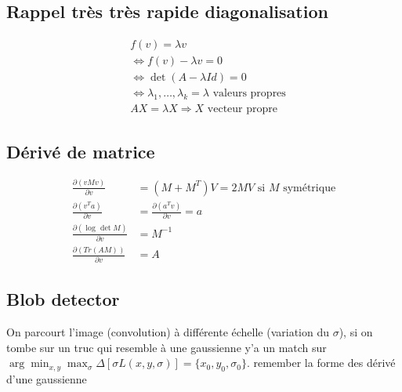 \documentclass{article}
\theoremstyle{plain}%
\theoremstyle{definition}
\theoremstyle{remark}
\begin{document}
\subsection{Rappel très très rapide diagonalisation}
\begin{align*}
    &f(v) = \lambda v \\
    & \Leftrightarrow f(v) - \lambda v = 0 \\
    & \Leftrightarrow \det (A - \lambda Id) = 0 \\
    & \Leftrightarrow \lambda _1 ,\dots, \lambda _k = \lambda \text{ valeurs propres} \\
    & AX = \lambda X \Rightarrow X \text{ vecteur propre }
\end{align*}

\subsection{Dérivé de matrice}
\begin{align*}
    \frac{\partial (vMv)}{\partial v} &= (M + M^T)V = 2MV \text{ si } M \text{ symétrique} \\
    \frac{\partial (v^T a)}{\partial v} &= \frac{\partial (a^T v)}{\partial v} = a \\
    \frac{\partial (\log_{} \det M)}{\partial v} &= M^{-1}\\
    \frac{\partial (Tr(AM))}{\partial v} &= A
\end{align*}

\subsection{Blob detector}
On parcourt l'image (convolution) à différente échelle (variation du $ \sigma  $), si on tombe sur un truc qui resemble à une gaussienne y'a un match sur $ \arg \min _{x,y} \max _\sigma \Delta [\sigma L(x,y,\sigma )] = \{x_0, y_0, \sigma _0\} $. remember la forme des dérivé d'une gaussienne
\end{document}
